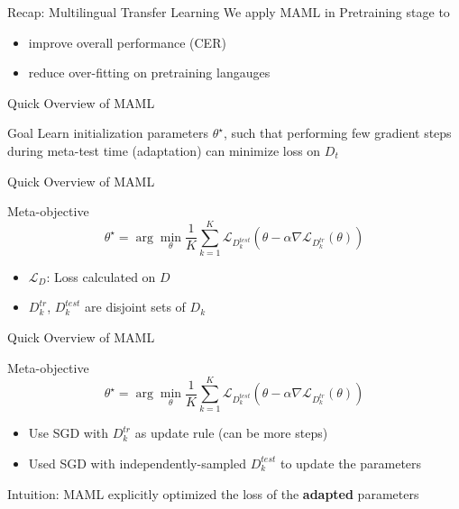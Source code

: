 \documentclass{beamer}
\begin{document}
\begin{frame}[t]{Recap: Multilingual Transfer Learning}
  We apply MAML in Pretraining stage to
  \begin{itemize}
    \item improve overall performance (CER)
    \item reduce over-fitting on pretraining langauges
  \end{itemize}
\end{frame}


\begin{frame}[t]{Quick Overview of MAML}
  \begin{block}{Goal}
    Learn initialization parameters $\theta^\star$, such that performing few gradient steps during meta-test time (adaptation) can minimize loss on $D_t$
  \end{block}

\end{frame}

\begin{frame}[t]{Quick Overview of MAML}
  \begin{block}{Meta-objective}
    \begin{equation*}
    \theta^\star = \arg \min_\theta \frac{1}{K}\sum_{k=1}^{K}\mathcal{L}_{D_k^{test}}(\theta - \alpha \nabla \mathcal{L}_{D_k^{tr}}(\theta))
    \end{equation*}
  \end{block}

  \begin{itemize}
    \item $\mathcal{L}_D$: Loss calculated on $D$
    \item $D_k^{tr}$, $D_k^{test}$ are disjoint sets of $D_k$
  \end{itemize}
\end{frame}

\begin{frame}[t]{Quick Overview of MAML}
  \begin{block}{Meta-objective}
    \begin{equation*}
    \theta^\star = \arg \min_\theta \frac{1}{K}\sum_{k=1}^{K}\mathcal{L}_{D_k^{test}}(\theta - \alpha \nabla \mathcal{L}_{D_k^{tr}}(\theta))
    \end{equation*}
  \end{block}

  \begin{itemize}
    \item Use SGD with $D_k^{tr}$ as update rule (can be more steps)
    \item Used SGD with independently-sampled $D_k^{test}$ to update the parameters
  \end{itemize}

  \vspace{1em}

  Intuition: MAML explicitly optimized the loss of the \textbf{adapted} parameters
\end{frame}
\end{document}
